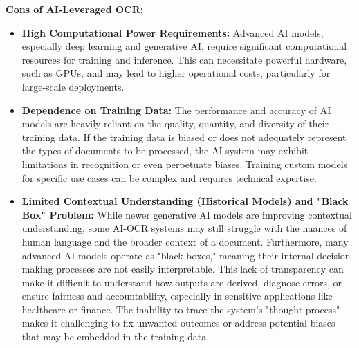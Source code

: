 \textbf{Cons of AI-Leveraged OCR:}
\begin{itemize}
    \item \textbf{High Computational Power Requirements:} Advanced AI models, especially deep learning and generative AI, require significant computational resources for training and inference. This can necessitate powerful hardware, such as GPUs, and may lead to higher operational costs, particularly for large-scale deployments.
    \item \textbf{Dependence on Training Data:} The performance and accuracy of AI models are heavily reliant on the quality, quantity, and diversity of their training data. If the training data is biased or does not adequately represent the types of documents to be processed, the AI system may exhibit limitations in recognition or even perpetuate biases. Training custom models for specific use cases can be complex and requires technical expertise.
    \item \textbf{Limited Contextual Understanding (Historical Models) and "Black Box" Problem:} While newer generative AI models are improving contextual understanding, some AI-OCR systems may still struggle with the nuances of human language and the broader context of a document. Furthermore, many advanced AI models operate as "black boxes," meaning their internal decision-making processes are not easily interpretable. This lack of transparency can make it difficult to understand how outputs are derived, diagnose errors, or ensure fairness and accountability, especially in sensitive applications like healthcare or finance. The inability to trace the system's "thought process" makes it challenging to fix unwanted outcomes or address potential biases that may be embedded in the training data.

\end{itemize}
